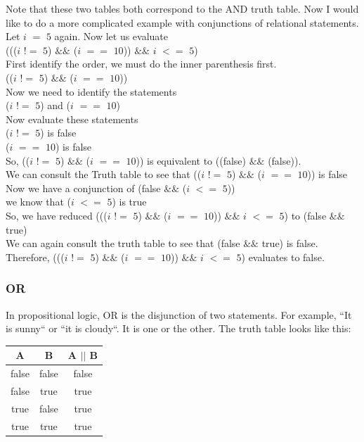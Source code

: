 \documentclass[11]{article}
\begin{document}
Note that these two tables both correspond to the AND truth table. Now I would like to do a more complicated example with conjunctions of relational statements. Let $i$ $=$ $5$ again. Now let us evaluate\\ ((($i$ $!=$ $5$) $\&\&$ ($i$ $==$ $10$)) $\&\&$ $i$ $<=$ $5$)\\

First identify the order, we must do the inner parenthesis first.\\
(($i$ $!=$ $5$) $\&\&$ ($i$ $==$ $10$))\\
Now we need to identify the statements\\
($i$ $!=$ $5$) and ($i$ $==$ $10$) \\
Now evaluate these statements \\
($i$ $!=$ $5$) is false\\
 ($i$ $==$ $10$) is false \\
 So, (($i$ $!=$ $5$) $\&\&$ ($i$ $==$ $10$)) is equivalent to ((false) $\&\&$ (false)).\\
 We can consult the Truth table to see that (($i$ $!=$ $5$) $\&\&$ ($i$ $==$ $10$)) is false\\
 
 Now we have a conjunction of (false $\&\&$ ($i$ $<=$ $5$))\\
 we know that ($i$ $<=$ $5$) is true \\
 So, we have reduced ((($i$ $!=$ $5$) $\&\&$ ($i$ $==$ $10$)) $\&\&$ $i$ $<=$ $5$) to (false $\&\&$ true)\\
 We can again consult the truth table to see that (false $\&\&$ true) is false.\\
 
 Therefore, ((($i$ $!=$ $5$) $\&\&$ ($i$ $==$ $10$)) $\&\&$ $i$ $<=$ $5$) evaluates to false.
 
 \subsubsection{OR}
 In propositional logic, OR is the disjunction of two statements. For example, ``It is sunny`` or ``it is cloudy``. It is one or the other. The truth table looks like this:\\
 
 \begin{center}
  \begin{tabular}{ | c | c | c |}
    \hline
    A & B & A $||$ B \\ \hline
    false & false & false \\ \hline
    false & true & true \\ \hline
    true & false & true \\ \hline
    true & true & true \\
    \hline
  \end{tabular}
\end{center}
\end{document}
